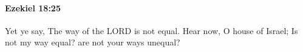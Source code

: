 
		\paragraph{Ezekiel 18:25} %
			\label{EZEKIEL-18-25}

			Yet ye say, The way of the LORD is not equal. Hear now, O house of Israel; Is not my way equal? are not your ways unequal?


